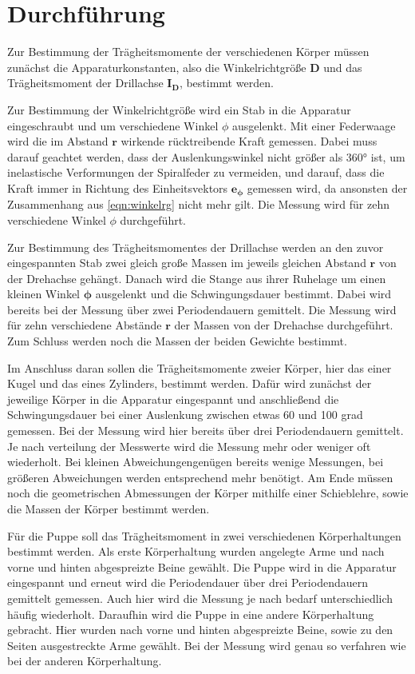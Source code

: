 \section{Durchführung}
\label{sec:Durchführung}

Zur Bestimmung der Trägheitsmomente der verschiedenen Körper müssen zunächst die
Apparaturkonstanten, also die Winkelrichtgröße $\symbf{D}$ und das Trägheitsmoment
der Drillachse $\symbf{I_D}$, bestimmt werden.

Zur Bestimmung der Winkelrichtgröße wird ein Stab in die Apparatur eingeschraubt und
um verschiedene Winkel $\phi$ ausgelenkt. Mit einer Federwaage wird die im Abstand
$\symbf{r}$ wirkende rücktreibende Kraft gemessen. Dabei muss darauf geachtet werden,
dass der Auslenkungswinkel nicht größer als 360° ist, um inelastische Verformungen der
Spiralfeder zu vermeiden, und darauf, dass die Kraft immer in Richtung des Einheitsvektors
$\symbf{e_{\phi}}$ gemessen wird, da ansonsten der Zusammenhang aus \eqref{eqn:winkelrg}
nicht mehr gilt. Die Messung wird für zehn verschiedene Winkel $\phi$ durchgeführt.

Zur Bestimmung des Trägheitsmomentes der Drillachse werden an den zuvor eingespannten
Stab zwei gleich große Massen im jeweils gleichen Abstand $\symbf{r}$ von der
Drehachse gehängt. Danach wird die Stange aus ihrer Ruhelage um einen kleinen Winkel
$\symbf{\phi}$ ausgelenkt und die Schwingungsdauer bestimmt. Dabei wird bereits bei
der Messung über zwei Periodendauern gemittelt. Die Messung wird für zehn verschiedene
Abstände $\symbf{r}$ der Massen von der Drehachse durchgeführt. Zum Schluss werden
noch die Massen der beiden Gewichte bestimmt.

Im Anschluss daran sollen die Trägheitsmomente zweier Körper, hier das einer Kugel und
das eines Zylinders, bestimmt werden. Dafür wird zunächst der jeweilige Körper in
die Apparatur eingespannt und anschließend die Schwingungsdauer bei einer Auslenkung
zwischen etwas 60 und 100 grad gemessen. Bei der Messung wird hier bereits über drei
Periodendauern gemittelt. Je nach verteilung der Messwerte wird die Messung mehr
oder weniger oft wiederholt. Bei kleinen Abweichungengenügen bereits wenige Messungen,
bei größeren Abweichungen werden entsprechend mehr benötigt. Am Ende müssen noch die
geometrischen Abmessungen der Körper mithilfe einer Schieblehre, sowie die Massen der
Körper bestimmt werden.

Für die Puppe soll das Trägheitsmoment in zwei verschiedenen Körperhaltungen bestimmt
werden. Als erste Körperhaltung wurden angelegte Arme und nach vorne und hinten
abgespreizte Beine gewählt. Die Puppe wird in die Apparatur eingespannt und erneut
wird die Periodendauer über drei Periodendauern gemittelt gemessen. Auch hier wird
die Messung je nach bedarf unterschiedlich häufig wiederholt.
Daraufhin wird die Puppe in eine andere Körperhaltung gebracht. Hier wurden nach vorne
und hinten abgespreizte Beine, sowie zu den Seiten ausgestreckte Arme gewählt. Bei der
Messung wird genau so verfahren wie bei der anderen Körperhaltung.
